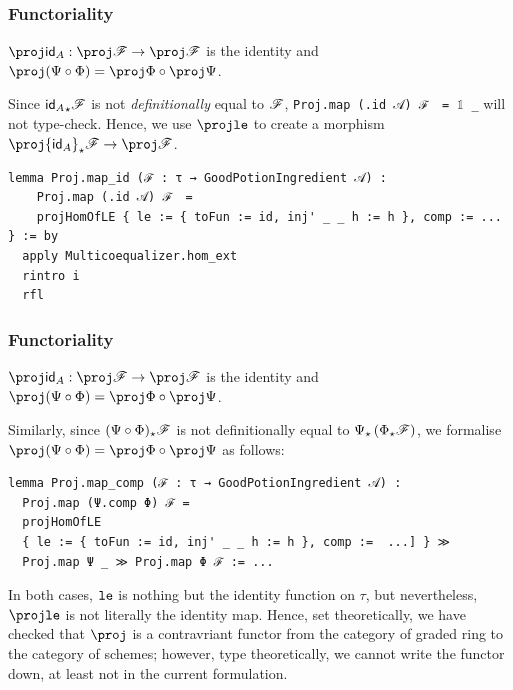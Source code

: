 \documentclass[9pt]{beamer}
\begin{document}
\begin{frame}[fragile]
\frametitle{Functoriality}

\begin{corollary}
  $\proj\id_A: \proj \scrF \to \proj \scrF$ is the identity and $\proj(\Psi \circ \Phi) = \proj \Phi \circ \proj \Psi$.
\end{corollary}
Since ${\mathsf{id}_A}_{\star}\mathscr{F}$ is not \emph{definitionally} equal to $\mathscr{F}$, \lstinline|Proj.map (.id 𝒜) ℱ  = 𝟙 _| will not type-check.
Hence, we use $\proj\leanmath{le}$ to create a morphism $\proj {\id_A}_{\star}\scrF \to \proj \scrF$.
\begin{lstlisting}[caption={$\proj$ is a contravariant functor}]
lemma Proj.map_id (ℱ : τ → GoodPotionIngredient 𝒜) :
    Proj.map (.id 𝒜) ℱ  =
    projHomOfLE { le := { toFun := id, inj' _ _ h := h }, comp := ... } := by
  apply Multicoequalizer.hom_ext
  rintro i
  rfl
\end{lstlisting}
\end{frame}

\begin{frame}[fragile]
\frametitle{Functoriality}

\begin{corollary}
  $\proj\id_A: \proj \scrF \to \proj \scrF$ is the identity and $\proj(\Psi \circ \Phi) = \proj \Phi \circ \proj \Psi$.
\end{corollary}
Similarly, since $(\Psi \circ \Phi)_{\star}\mathscr{F}$ is not definitionally equal to $\Psi_{\star}\left( \Phi_{\star}\mathscr{F} \right)$, we formalise 
$\proj(\Psi \circ \Phi) = \proj \Phi \circ \proj \Psi$ as follows:
\begin{lstlisting}
lemma Proj.map_comp (ℱ : τ → GoodPotionIngredient 𝒜) :
  Proj.map (Ψ.comp Φ) ℱ =
  projHomOfLE
  { le := { toFun := id, inj' _ _ h := h }, comp :=  ...] } ≫ 
  Proj.map Ψ _ ≫ Proj.map Φ ℱ := ...
\end{lstlisting}
In both cases, ${\footnotesize{\mathtt{le}}}$ is nothing but the identity function on $\tau$, but nevertheless, 
$\proj\leanmath{le}$ is not literally the identity map. Hence, set theoretically, we have checked that $\proj$ is a contravriant functor
from the category of graded ring to the category of schemes; however, type theoretically, we cannot write the functor down, at least not in the current formulation.
\end{frame}
\end{document}
